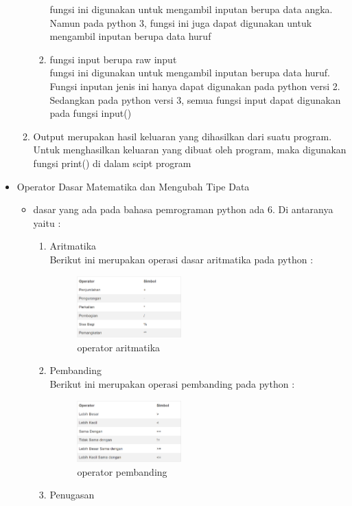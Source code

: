 \begin{itemize}
\begin{enumerate}
\begin{enumerate}
		fungsi ini digunakan untuk mengambil inputan berupa data angka. Namun pada python 3, fungsi ini juga dapat digunakan untuk mengambil inputan berupa data huruf\
		\item fungsi input berupa raw input\\
		fungsi ini digunakan untuk mengambil inputan berupa data huruf. Fungsi inputan jenis ini hanya dapat digunakan pada python versi 2. Sedangkan pada python versi 3, semua fungsi input dapat digunakan pada fungsi input()
		\end{enumerate}
	\item Output merupakan hasil keluaran yang dihasilkan dari suatu program. Untuk menghasilkan keluaran yang dibuat oleh program, maka digunakan fungsi print() di dalam scipt program
	\end{enumerate} 
	\item Operator Dasar Matematika dan Mengubah Tipe Data\\
		\begin{itemize}
		\item dasar yang ada pada bahasa pemrograman python ada 6. Di antaranya yaitu :
		\begin{enumerate}
			\item Aritmatika\\
				Berikut ini merupakan operasi dasar aritmatika pada python :
				\begin{figure}[H]
				\includegraphics[width=4cm]{figures/1184030/arit.png}
				\centering
				\caption{operator aritmatika}
				\end{figure}
			\item Pembanding\\
				Berikut ini merupakan operasi pembanding pada python :
				\begin{figure}[H]
				\includegraphics[width=4cm]{figures/1184030/pembanding.png}
				\centering
				\caption{operator pembanding}
				\end{figure}
			\item Penugasan\\

\end{enumerate}
\end{itemize}
\end{itemize}
